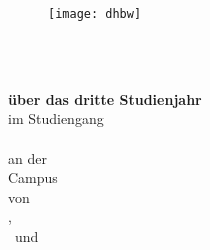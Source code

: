 
\begin{titlepage}


\begin{figure}
	\raggedleft
	\texttt{[image: dhbw]}
\end{figure}


\begin{center}
	\vspace*{0pt}
	\begin{LARGE}
		\textbf{\mytitle}\\
	\end{LARGE}
	\vspace*{4em}
	\textbf{\MakeUppercase{\mytypeofwork}\\über das dritte Studienjahr}\\
	\vspace*{2em}
	im Studiengang\\
	\mycourse\\
	\vspace*{2em}
	an der \myuniversity\\
	Campus \myuniversitycampus\\
	\vspace*{2em}
	von\\
	\vspace*{2em}
	\myauthora,\\\myauthorb\ und\\\myauthorc\\
	\vspace*{2em}
	\myduedate\\
	\vspace*{3em}
	\vfill
	

\end{center}
\end{titlepage}
